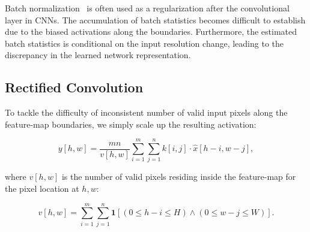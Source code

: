 Batch normalization~\cite{ioffe2015batch} is often used as a regularization after the convolutional layer in CNNs. The accumulation of batch statistics becomes difficult to establish due to the biased activations along the boundaries. Furthermore, the estimated batch statistics is conditional on the input resolution change, leading to the discrepancy in the learned network representation. 

\subsection{Rectified Convolution}

To tackle the difficulty of inconsistent number of valid input pixels along the feature-map boundaries, we simply scale up the resulting activation: 

\begin{equation}
    y[h, w]=\frac{mn}{v[h, w]}\sum_{i=1}^m\sum_{j=1}^n k[i, j] \cdot \hat{x}[h-i, w-j] ,
\label{eq:rfconv}
\end{equation}

where $v[h, w]$ is the number of valid pixels residing inside the feature-map for the pixel location at $h, w$:

\begin{equation}
    v[h, w]=\sum_{i=1}^m\sum_{j=1}^n\mathbf{1}[(0\le h-i\le H) \land (0 \le w-j \le W)].
\end{equation}




